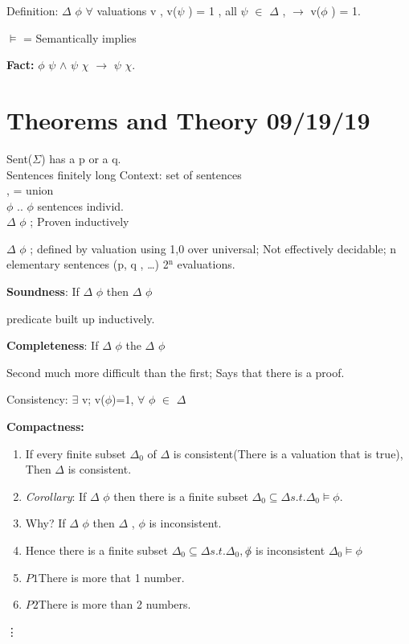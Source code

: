 \documentclass[11pt]{article}
\begin{document}
Definition: \(\Delta\) \vDash \(\phi\) \iff \(\forall\) valuations v , v(\(\psi\) ) = 1 , all \(\psi\) \(\in\) \(\Delta\) , \(\rightarrow\) v(\(\phi\) ) = 1.

\(\vDash\) = Semantically implies

\textbf{Fact:} \(\phi\) \vDash \(\psi\) \(\wedge\) \(\psi\) \vDash \(\chi\) \(\rightarrow\) \(\psi\) \vDash \(\chi\).

\section{Theorems and Theory 09/19/19}
\label{sec:org728871a}
Sent(\(\Sigma\))  has a p or a q.\\
Sentences finitely long
Context: set of sentences\\
, = union\\
\(\phi\) .. \(\phi\) sentences individ.\\

\(\Delta\) \vdash \(\phi\) ; Proven inductively

\(\Delta\) \vDash \(\phi\) ; defined by valuation using 1,0 over universal; Not effectively decidable;
 n elementary sentences (p, q , \ldots{}) 2\(^{\text{n}}\) evaluations.

\textbf{Soundness}: If \(\Delta\) \vdash \(\phi\) then \(\Delta\) \vDash \(\phi\)

predicate built up inductively.

\textbf{Completeness}: If \(\Delta\) \vDash \(\phi\) the \(\Delta\) \vdash \(\phi\)

Second much more difficult than the first; Says that there is a proof.

Consistency: \(\exists\) v; v(\(\phi\))=1, \(\forall\) \(\phi\) \(\in\) \(\Delta\)

\textbf{Compactness:} 
\begin{enumerate}
\item If every finite subset \(\Delta_0\) of \(\Delta\) is consistent(There is a valuation that is true), Then \(\Delta\) is consistent.
\item \emph{Corollary}: If \(\Delta\) \vDash \(\phi\) then there is a finite subset \(\Delta_0 \subseteq \Delta s.t. \Delta_0 \vDash \phi.\)
\item Why? If \(\Delta\) \vDash \(\phi\) then \(\Delta\) , \textlnot{} \(\phi\) is inconsistent.
\item Hence there is a finite subset \(\Delta_0  \subseteq \Delta s.t. \Delta_0 , \not \phi\) is inconsistent \(\Delta_0 \vDash \phi\)

\item \(P1\)There is more that 1 number.
\item \(P2\)There is more than 2 numbers.
\end{enumerate}
\vdots
\end{document}
